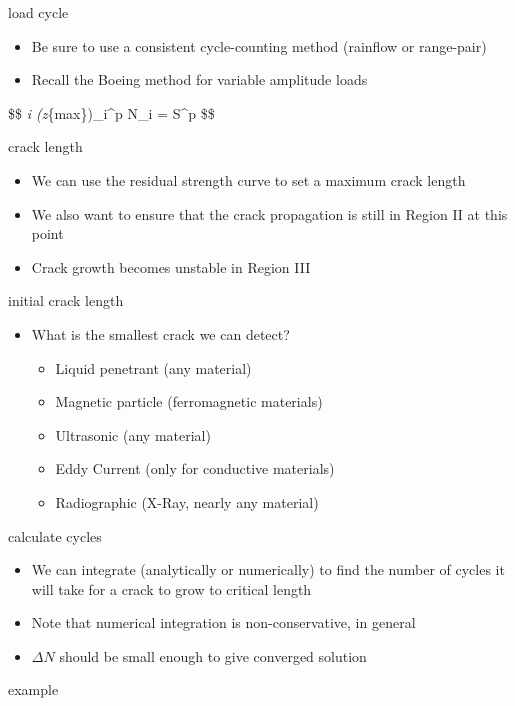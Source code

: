 \documentclass[
  letterpaper,
  ignorenonframetext,
  aspectratio=43,
  handout,
  12pt]{beamer}
\providecommand{\tightlist}{%
  \setlength{\itemsep}{0pt}\setlength{\parskip}{0pt}}
\providecommand{\tightlist}{%
\setlength{\itemsep}{0pt}\setlength{\parskip}{0pt}}
\begin{document}
\begin{frame}{load cycle}
\protect\hypertarget{load-cycle}{}
\begin{itemize}
\tightlist
\item
  Be sure to use a consistent cycle-counting method (rainflow or
  range-pair)
\item
  Recall the Boeing method for variable amplitude loads
\end{itemize}

\$\$ \sum\emph{i (z\sigma}\{max\})\_i\^{}p N\_i = S\^{}p \$\$
\end{frame}

\begin{frame}{crack length}
\protect\hypertarget{crack-length}{}
\begin{itemize}
\tightlist
\item
  We can use the residual strength curve to set a maximum crack length
\item
  We also want to ensure that the crack propagation is still in Region
  II at this point
\item
  Crack growth becomes unstable in Region III
\end{itemize}
\end{frame}

\begin{frame}{initial crack length}
\protect\hypertarget{initial-crack-length}{}
\begin{itemize}
\tightlist
\item
  What is the smallest crack we can detect?

  \begin{itemize}
  \tightlist
  \item
    Liquid penetrant (any material)
  \item
    Magnetic particle (ferromagnetic materials)
  \item
    Ultrasonic (any material)
  \item
    Eddy Current (only for conductive materials)
  \item
    Radiographic (X-Ray, nearly any material)
  \end{itemize}
\end{itemize}
\end{frame}

\begin{frame}{calculate cycles}
\protect\hypertarget{calculate-cycles}{}
\begin{itemize}
\tightlist
\item
  We can integrate (analytically or numerically) to find the number of
  cycles it will take for a crack to grow to critical length
\item
  Note that numerical integration is non-conservative, in general
\item
  \(\Delta N\) should be small enough to give converged solution
\end{itemize}
\end{frame}

\begin{frame}{example}
\protect\hypertarget{example}{}
\end{frame}
\end{document}
